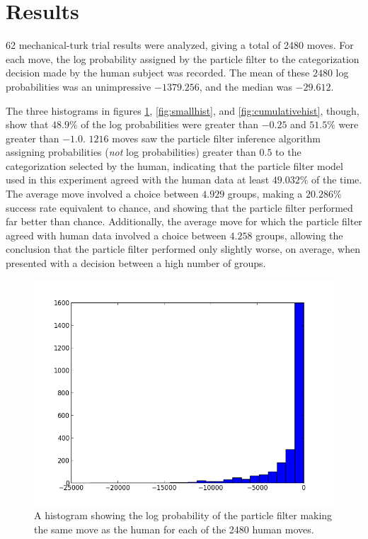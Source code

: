 \section{Results}
\label{sec:results}

62 mechanical-turk trial results were analyzed, giving a total of 2480 moves.
For each move, the log probability assigned by the particle filter to the
categorization decision made by the human subject was recorded. The mean of these
$2480$ log probabilities was an unimpressive $-1379.256$, and the median was
$-29.612$.

The three histograms in figures \ref{fig:fullhist}, \ref{fig:smallhist}, and
\ref{fig:cumulativehist}, though, show that $48.9\%$ of the
log probabilities were greater than $-0.25$ and $51.5\%$ were greater than
$-1.0$. $1216$ moves saw the particle filter inference algorithm assigning
probabilities (\emph{not} log probabilities) greater than $0.5$ to the
categorization selected by the human, indicating that the particle filter model
used in this experiment agreed with the human data at least $49.032\%$ of the
time. The average move involved a choice between $4.929$ groups, making a
$20.286\%$ success rate equivalent to chance, and showing that the particle
filter performed far better than chance. Additionally, the average move for
which the particle filter agreed with human data involved a choice between
$4.258$ groups, allowing the conclusion that the particle filter performed only slightly
worse, on average, when presented with a decision between a high number of
groups.

\begin{figure}
\centering
\includegraphics[scale=0.75]{img/hist0.png}
\caption{A histogram showing the log probability of the particle filter making
the same move as the human for each of the 2480 human moves.}
\label{fig:fullhist}
\end{figure}

